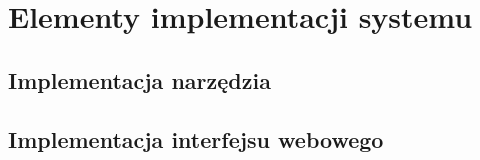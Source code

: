 \documentclass[../thesis.tex]{subfiles}
\begin{document}
\pagestyle{plain}
\chapter{Elementy implementacji systemu}
\section{Implementacja narzędzia}
\section{Implementacja interfejsu webowego}
\end{document}
